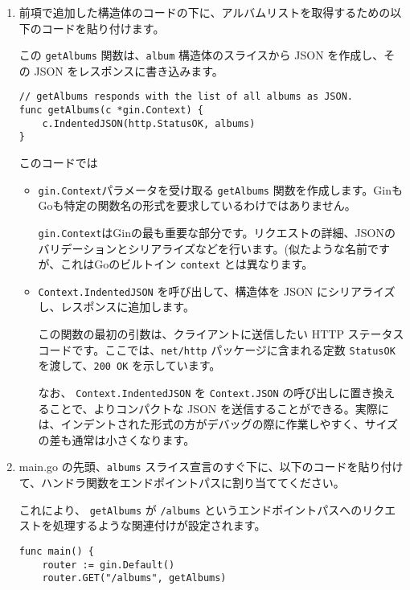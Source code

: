 \begin{enumerate}
\item
  前項で追加した構造体のコードの下に、アルバムリストを取得するための以下のコードを貼り付けます。

  この \texttt{getAlbums} 関数は、\texttt{album} 構造体のスライスから
  JSON を作成し、その JSON をレスポンスに書き込みます。

\begin{lstlisting}[numbers=none]
// getAlbums responds with the list of all albums as JSON.
func getAlbums(c *gin.Context) {
    c.IndentedJSON(http.StatusOK, albums)
}
\end{lstlisting}

  このコードでは

  \begin{itemize}
  \item
    \texttt{gin.Context}パラメータを受け取る \texttt{getAlbums}
    関数を作成します。GinもGoも特定の関数名の形式を要求しているわけではありません。

    \texttt{gin.Context}はGinの最も重要な部分です。リクエストの詳細、JSONのバリデーションとシリアライズなどを行います。(似たような名前ですが、これはGoのビルトイン
    \texttt{context} とは異なります。
  \item
    \texttt{Context.IndentedJSON} を呼び出して、構造体を JSON
    にシリアライズし、レスポンスに追加します。

    この関数の最初の引数は、クライアントに送信したい HTTP
    ステータスコードです。ここでは、\texttt{net/http}
    パッケージに含まれる定数 \texttt{StatusOK}
    を渡して、\texttt{200\ OK} を示しています。

    なお、 \texttt{Context.IndentedJSON} を \texttt{Context.JSON}
    の呼び出しに置き換えることで、よりコンパクトな JSON
    を送信することができる。実際には、インデントされた形式の方がデバッグの際に作業しやすく、サイズの差も通常は小さくなります。
  \end{itemize}
\item
  main.go の先頭、\texttt{albums}
  スライス宣言のすぐ下に、以下のコードを貼り付けて、ハンドラ関数をエンドポイントパスに割り当ててください。

  これにより、 \texttt{getAlbums} が \texttt{/albums}
  というエンドポイントパスへのリクエストを処理するような関連付けが設定されます。

\begin{lstlisting}[numbers=none]
func main() {
    router := gin.Default()
    router.GET("/albums", getAlbums)


\end{lstlisting}
\end{enumerate}
